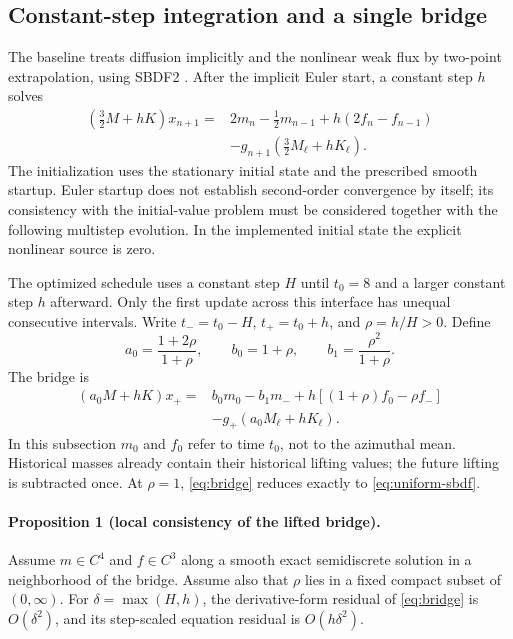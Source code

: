 \subsection{Constant-step integration and a single bridge}
\label{sec:time-phase}

The baseline treats diffusion implicitly and the nonlinear weak flux
by two-point extrapolation, using SBDF2 \cite{r9,r12}. After the
implicit Euler start, a constant step \(h\) solves
\begin{equation}
 \begin{aligned}
 (\tfrac32M+hK)x_{n+1}
  ={}&2m_n-\tfrac12m_{n-1}+h(2f_n-f_{n-1})\\
   &-g_{n+1}(\tfrac32M_\ell+hK_\ell).
 \end{aligned}
 \label{eq:uniform-sbdf}
\end{equation}
The initialization uses the stationary initial state and the
prescribed smooth startup. Euler startup does not establish
second-order convergence by itself; its consistency with the
initial-value problem must be considered together with the following
multistep evolution. In the implemented initial state the explicit
nonlinear source is zero.

The optimized schedule uses a constant step \(H\) until \(t_0=8\)
and a larger constant step \(h\) afterward. Only the first update
across this interface has unequal consecutive intervals. Write
\(t_-=t_0-H\), \(t_+=t_0+h\), and \(\rho=h/H>0\). Define
\begin{equation}
 a_0=\frac{1+2\rho}{1+\rho},\qquad b_0=1+\rho,\qquad
 b_1=\frac{\rho^2}{1+\rho}.
 \label{eq:bridge-coefficients}
\end{equation}
The bridge is
\begin{equation}
 \begin{aligned}
 (a_0M+hK)x_+={}&b_0m_0-b_1m_-+
 h[(1+\rho)f_0-\rho f_-]\\
 &-g_+(a_0M_\ell+hK_\ell).
 \end{aligned}
 \label{eq:bridge}
\end{equation}
In this subsection \(m_0\) and \(f_0\) refer to time \(t_0\),
not to the azimuthal mean. Historical masses already contain their
historical lifting values; the future lifting is subtracted once.
At \(\rho=1\), \eqref{eq:bridge} reduces exactly to
\eqref{eq:uniform-sbdf}.

\paragraph{Proposition 1 (local consistency of the lifted bridge).}
Assume \(m\in C^4\) and \(f\in C^3\) along a smooth exact
semidiscrete solution in a neighborhood of the bridge. Assume also
that \(\rho\) lies in a fixed compact subset of \((0,\infty)\).
For \(\delta=\max(H,h)\), the derivative-form residual of
\eqref{eq:bridge} is \(O(\delta^2)\), and its step-scaled
equation residual is \(O(h\delta^2)\).


